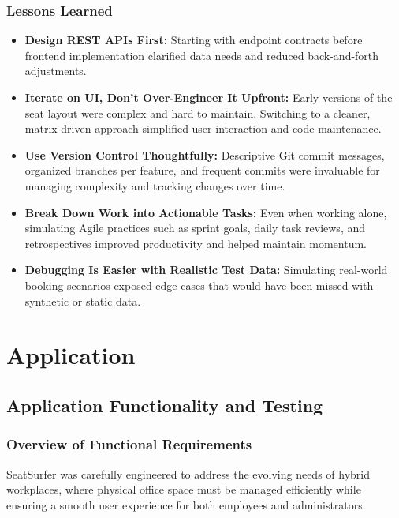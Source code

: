 \documentclass[12pt,a4paper]{report} %
\begin{document}
\subsection*{Lessons Learned}

\begin{itemize}
\item \textbf{Design REST APIs First:}
Starting with endpoint contracts before frontend implementation clarified data needs and reduced back-and-forth adjustments.
\item \textbf{Iterate on UI, Don’t Over-Engineer It Upfront:}  
Early versions of the seat layout were complex and hard to maintain. Switching to a cleaner, matrix-driven approach simplified user interaction and code maintenance.
\item \textbf{Use Version Control Thoughtfully:}  
Descriptive Git commit messages, organized branches per feature, and frequent commits were invaluable for managing complexity and tracking changes over time.
\item \textbf{Break Down Work into Actionable Tasks:}  
Even when working alone, simulating Agile practices such as sprint goals, daily task reviews, and retrospectives improved productivity and helped maintain momentum.
\item \textbf{Debugging Is Easier with Realistic Test Data:}  
Simulating real-world booking scenarios exposed edge cases that would have been missed with synthetic or static data.
\end{itemize}

\newpage

\chapter{Application}
\section{Application Functionality and Testing}

\subsection{Overview of Functional Requirements}

SeatSurfer was carefully engineered to address the evolving needs of hybrid workplaces, where physical office space must be managed efficiently while ensuring a smooth user experience for both employees and administrators.
\end{document}
